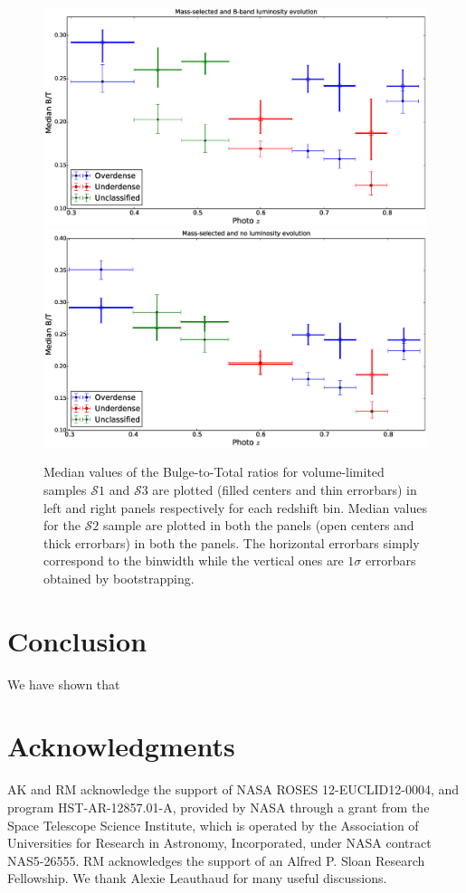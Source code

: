 \documentclass[twocolumn,useAMS,usenatbib]{mn2e}
\newcommand{\btt}{Bulge-to-Total }
\newcommand{\s}{\ensuremath{\mathcal{S}}}
\begin{document}
\begin{figure}
 \centering
 \includegraphics[width=\columnwidth]{median_dvcbtt}
 \includegraphics[width=\columnwidth]{median_dvcbtt(2)}
  \caption{Median values of the \btt ratios for volume-limited samples \s$1$ and \s$3$ are plotted (filled centers and thin errorbars) in left and right panels respectively for each redshift bin.
          Median values for the \s$2$ sample are plotted in both the panels (open centers and thick errorbars) in both the panels.
          The horizontal errorbars simply correspond to the binwidth while the vertical ones are $1\sigma$ errorbars obtained by bootstrapping.}
 \label{fig:median_dvcbtt}
\end{figure}

\section{Conclusion}
\label{S:conclusion}

We have shown that 
\section*{Acknowledgments}

AK and RM acknowledge the support of NASA ROSES 12-EUCLID12-0004, and
program HST-AR-12857.01-A, provided by NASA through a grant from the
Space Telescope Science Institute, which is operated by the
Association of Universities for Research in Astronomy, Incorporated,
under NASA contract NAS5-26555. RM acknowledges the support of an Alfred P. Sloan Research Fellowship.  We thank Alexie Leauthaud for 
many useful discussions.



\end{document}
